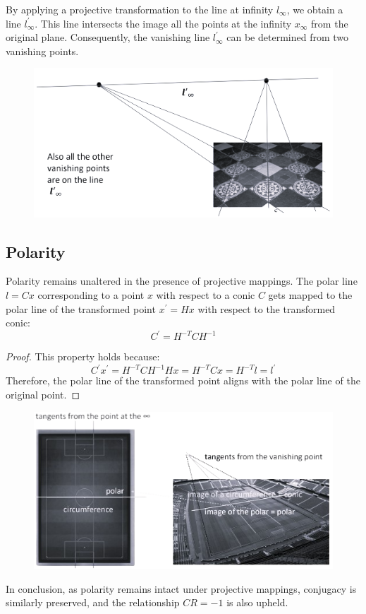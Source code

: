 \documentclass[12pt, a4paper]{report}
\begin{document}
    By applying a projective transformation to the line at infinity $l_{\infty}$, we obtain a line $l_{\infty}^{'}$. 
    This line intersects the image all the points at the infinity $x_{\infty}$ from  the original plane. 
    Consequently, the vanishing line $l_{\infty}^{'}$ can be determined from two vanishing points. 
    \begin{figure}[H]
        \centering
        \includegraphics[width=0.5\linewidth]{images/vanishingline.png}
    \end{figure}

    \subsection{Polarity}
    Polarity remains unaltered in the presence of projective mappings.
    The polar line $l=Cx$ corresponding to a point $x$ with respect to a conic $C$ gets mapped to the polar line of the transformed point $x^{'} = Hx$ with respect to the transformed conic:
    \[C^{'}=H^{-T}CH^{-1}\]
    \begin{proof}
        This property holds because:
        \[C^{'}x^{'}=H^{-T}CH^{-1}Hx=H^{-T}Cx=H^{-T}l=l^{'}\]
        Therefore, the polar line of the transformed point aligns with the polar line of the original point.
    \end{proof}
    \begin{figure}[H]
        \centering
        \includegraphics[width=0.75\linewidth]{images/polarity.png}
    \end{figure}
    In conclusion, as polarity remains intact under projective mappings, conjugacy is similarly preserved, and the relationship $CR=-1$ is also upheld.
\end{document}
